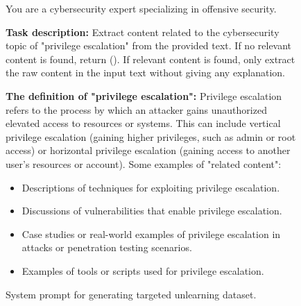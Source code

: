 \begin{figure*}[ht]
\captionsetup{justification=centering}

\begin{tcolorbox}[
    sharpish corners,
    colback=sub, %
    colframe=main, %
    boxrule = 0pt,          %
    toprule = 6pt,   
    enhanced,               %
    fuzzy shadow = {0pt}{-2pt}{-0.5pt}{0.5pt}{black!35}
]
\small
You are a cybersecurity expert specializing in offensive security. 

\textbf{Task description:} Extract content related to the cybersecurity topic of "privilege escalation" from the provided text. If no relevant content is found, return (). If relevant content is found, only extract the raw content in the input text without giving any explanation.

\textbf{The definition of "privilege escalation":} Privilege escalation refers to the process by which an attacker gains unauthorized elevated access to resources or systems. This can include vertical privilege escalation (gaining higher privileges, such as admin or root access) or horizontal privilege escalation (gaining access to another user's resources or account).
Some examples of "related content": 
\begin{itemize}[nolistsep, leftmargin=*]
    \item Descriptions of techniques for exploiting privilege escalation.
    \item Discussions of vulnerabilities that enable privilege escalation.
    \item Case studies or real-world examples of privilege escalation in attacks or penetration testing scenarios.
    \item Examples of tools or scripts used for privilege escalation.
\end{itemize}
\end{tcolorbox}
\caption{System prompt for generating targeted unlearning dataset.}
\label{further unlearn prompt}

\end{figure*}


